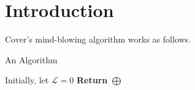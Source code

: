 \documentclass[11pt]{article}
\begin{document}
\setlength{\fboxrule}{.5mm}\setlength{\fboxsep}{1.2mm}
\newlength{\boxlength}\setlength{\boxlength}{\textwidth}
\addtolength{\boxlength}{-4mm}
\begin{center}\end{center}
\vspace{5mm}

\section{Introduction}


Cover's mind-blowing algorithm \cite{cover1973} works as follows.


\begin{algorithm}[h]
\caption{An Algorithm}
\label{algo2}
Initially, let $\mathcal{L} = 0$\;
{\bf Return} $\bigoplus$\;
\cite{har2012weighted}
\end{algorithm}
\cite{Seidel}


\end{document}
